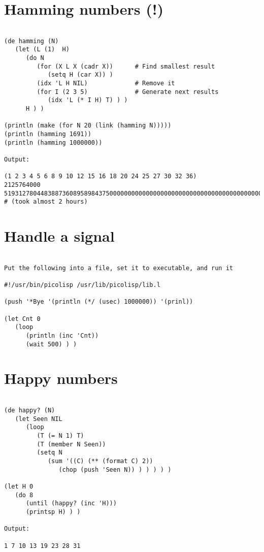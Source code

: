 \section*{Hamming numbers (!)}

\begin{verbatim}

(de hamming (N)
   (let (L (1)  H)
      (do N
         (for (X L X (cadr X))      # Find smallest result
            (setq H (car X)) )
         (idx 'L H NIL)             # Remove it
         (for I (2 3 5)             # Generate next results
            (idx 'L (* I H) T) ) )
      H ) )

(println (make (for N 20 (link (hamming N)))))
(println (hamming 1691))
(println (hamming 1000000))

Output:

(1 2 3 4 5 6 8 9 10 12 15 16 18 20 24 25 27 30 32 36)
2125764000
519312780448388736089589843750000000000000000000000000000000000000000000000000000000
# (took almost 2 hours)

\end{verbatim}

\section*{Handle a signal}

\begin{verbatim}

Put the following into a file, set it to executable, and run it

#!/usr/bin/picolisp /usr/lib/picolisp/lib.l

(push '*Bye '(println (*/ (usec) 1000000)) '(prinl))

(let Cnt 0
   (loop
      (println (inc 'Cnt))
      (wait 500) ) )

\end{verbatim}

\section*{Happy numbers}

\begin{verbatim}

(de happy? (N)
   (let Seen NIL
      (loop
         (T (= N 1) T)
         (T (member N Seen))
         (setq N
            (sum '((C) (** (format C) 2))
               (chop (push 'Seen N)) ) ) ) ) )

(let H 0
   (do 8
      (until (happy? (inc 'H)))
      (printsp H) ) )

Output:

1 7 10 13 19 23 28 31

\end{verbatim}

